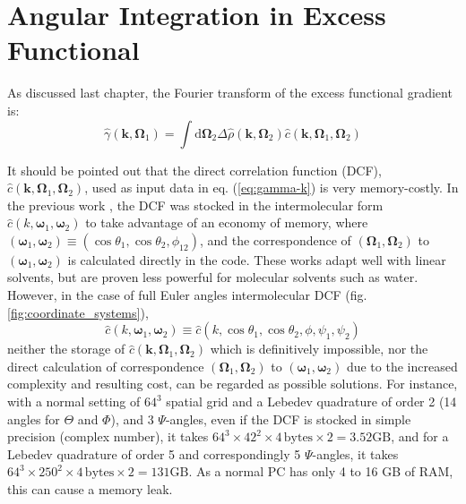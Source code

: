 
\chapter{Angular Integration in Excess Functional \label{chpt:fft-spatial}}

As discussed last chapter, the Fourier transform of the excess
functional gradient is:
\begin{equation}
\hat{\gamma}(\mathbf{k},\mathbf{\Omega}_{1})=\int\mathrm{d}\mathbf{\Omega}_{2}\Delta\hat{\rho}(\mathbf{k},\mathbf{\Omega}_{2})\hat{c}(\mathbf{k},\mathbf{\Omega}_{1},\mathbf{\Omega}_{2})\label{eq:gamma-k}
\end{equation}

It should be pointed out that the direct correlation function (\acs{DCF}),
$\hat{c}(\mathbf{k},\mathbf{\Omega}_{1},\mathbf{\Omega}_{2})$, used
as input data in eq. (\ref{eq:gamma-k}) is very memory-costly.
In the previous work \citep{gendre_classical_2009,Zhao_2011,borgis_molecular_2012},
the \acs{DCF} was stocked in the intermolecular form $\hat{c}(k,\boldsymbol{\omega}_{1},\boldsymbol{\omega}_{2})$
to take advantage of an economy of memory, where $(\boldsymbol{\omega}_{1},\boldsymbol{\omega}_{2})\equiv(\cos\theta_{1},\cos\theta_{2},\phi_{12})$,
and the correspondence of $(\mathbf{\Omega}_{1},\mathbf{\Omega}_{2})$
to $(\boldsymbol{\omega}_{1},\boldsymbol{\omega}_{2})$ is calculated
directly in the code. These works adapt well with linear solvents,
but are proven less powerful for molecular solvents such as water.
However, in the case of full Euler angles intermolecular \acs{DCF}
(fig. \ref{fig:coordinate_systems}), 
\begin{equation}
\hat{c}(k,\boldsymbol{\omega}_{1},\boldsymbol{\omega}_{2})\equiv\hat{c}(k,\cos\theta_{1},\cos\theta_{2},\phi,\psi_{1},\psi_{2})
\end{equation}
neither the storage of $\hat{c}(\mathbf{k},\mathbf{\Omega}_{1},\mathbf{\Omega}_{2})$
which is definitively impossible, nor the direct calculation of correspondence
$(\mathbf{\Omega}_{1},\mathbf{\Omega}_{2})$ to $(\boldsymbol{\omega}_{1},\boldsymbol{\omega}_{2})$
due to the increased complexity and resulting cost, can be regarded
as possible solutions. For instance, with a normal setting of $64^{3}$
spatial grid and a Lebedev quadrature of order 2 (14 angles for $\Theta$
and $\Phi$), and 3 $\Psi$-angles, even if the \acs{DCF} is stocked
in simple precision (complex number), it takes $64^{3}\times42^{2}\times4\,\mathrm{bytes}\times2=3.52\mathrm{GB}$,
and for a Lebedev quadrature of order 5 and correspondingly 5 $\Psi$-angles,
it takes $64^{3}\times250^{2}\times4\,\mathrm{bytes}\times2=131\mathrm{GB}$.
As a normal PC has only 4 to 16 GB of RAM, this can cause a memory leak. 

